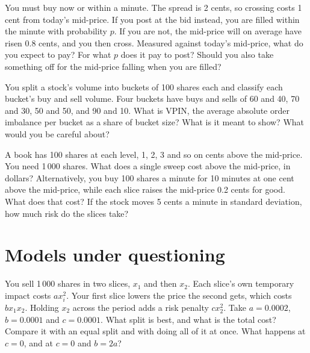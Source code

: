 \begin{question}\label{iq:iv2:markets-and-microstructure:32}
You must buy now or within a minute. The spread is 2 cents, so crossing costs 1 cent from today's mid-price. If you post at the bid instead, you are filled within the minute with probability $p$. If you are not, the mid-price will on average have risen 0.8 cents, and you then cross. Measured against today's mid-price, what do you expect to pay? For what $p$ does it pay to post? Should you also take something off for the mid-price falling when you are filled?
\end{question}

\begin{question}\label{iq:iv2:markets-and-microstructure:33}
You split a stock's volume into buckets of 100 shares each and classify each bucket's buy and sell volume. Four buckets have buys and sells of 60 and 40, 70 and 30, 50 and 50, and 90 and 10. What is VPIN, the average absolute order imbalance per bucket as a share of bucket size? What is it meant to show? What would you be careful about?
\end{question}

\begin{question}\label{iq:iv2:markets-and-microstructure:34}
A book has 100 shares at each level, 1, 2, 3 and so on cents above the mid-price. You need 1\,000 shares. What does a single sweep cost above the mid-price, in dollars? Alternatively, you buy 100 shares a minute for 10 minutes at one cent above the mid-price, while each slice raises the mid-price 0.2 cents for good. What does that cost? If the stock moves 5 cents a minute in standard deviation, how much risk do the slices take?
\end{question}

\section{Models under questioning}

\begin{question}\label{iq:iv2:markets-and-microstructure:35}
You sell 1\,000 shares in two slices, $x_1$ and then $x_2$. Each slice's own temporary impact costs $a x_i^2$. Your first slice lowers the price the second gets, which costs $b x_1 x_2$. Holding $x_2$ across the period adds a risk penalty $c x_2^2$. Take $a = 0.0002$, $b = 0.0001$ and $c = 0.0001$. What split is best, and what is the total cost? Compare it with an equal split and with doing all of it at once. What happens at $c = 0$, and at $c = 0$ and $b = 2a$?
\end{question}


